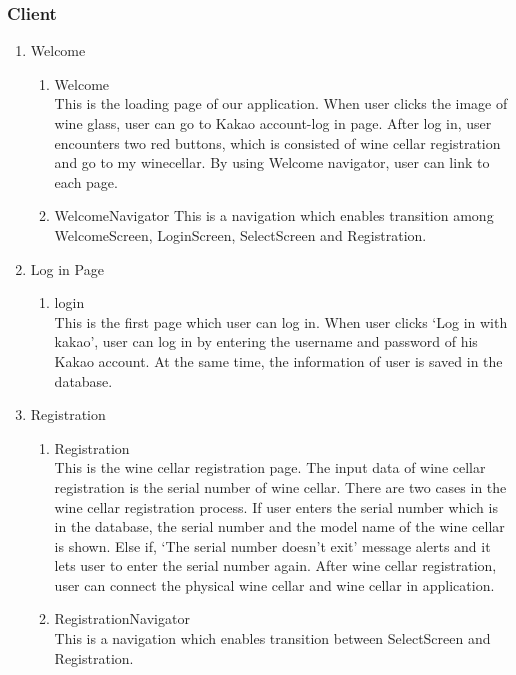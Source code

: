 \documentclass[conference]{IEEEtran}
\numberwithin{figure}{subsection}
\begin{document}
    \subsubsection{Client}
    \begin{enumerate}
        \item Welcome
        \begin{enumerate}
            \item Welcome\\
            This is the loading page of our application. When user clicks the image of wine glass, user can go to Kakao account-log in page. After log in, user encounters two red buttons, which is consisted of wine cellar registration and go to my winecellar. By using Welcome navigator, user can link to each page.  
            \item WelcomeNavigator 
             This is a navigation which enables transition among WelcomeScreen, LoginScreen, SelectScreen and Registration. 
        \end{enumerate}
        \item Log in Page
        \begin{enumerate}
            \item login\\
             This is the first page which user can log in. When user clicks ‘Log in with kakao’, user can log in by entering the username and password of his Kakao account. At the same time, the information of user is saved in the database.  
        \end{enumerate}
        \item Registration
        \begin{enumerate}
            \item Registration\\ 
            This is the wine cellar registration page. The input data of wine cellar registration is the serial number of wine cellar. There are two cases in the wine cellar registration process. If user enters the serial number which is in the database, the serial number and the model name of the wine cellar is shown. Else if, ‘The serial number doesn’t exit’ message alerts and it lets user to enter the serial number again. After wine cellar registration, user can connect the physical wine cellar and wine cellar in application. 
            \item RegistrationNavigator\\
            This is a navigation which enables transition between SelectScreen and Registration.

\end{enumerate}
\end{enumerate}
\end{document}
